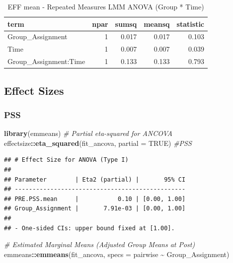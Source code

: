 \documentclass[
]{article}
\newenvironment{Shaded}{\begin{snugshade}}{\end{snugshade}}
\newcommand{\AttributeTok}[1]{\textcolor[rgb]{0.13,0.29,0.53}{#1}}
\newcommand{\CommentTok}[1]{\textcolor[rgb]{0.56,0.35,0.01}{\textit{#1}}}
\newcommand{\ConstantTok}[1]{\textcolor[rgb]{0.56,0.35,0.01}{#1}}
\newcommand{\FunctionTok}[1]{\textcolor[rgb]{0.13,0.29,0.53}{\textbf{#1}}}
\newcommand{\NormalTok}[1]{#1}
\newcommand{\SpecialCharTok}[1]{\textcolor[rgb]{0.81,0.36,0.00}{\textbf{#1}}}
\begin{document}
\begin{longtable}[t]{lrrrr}
\caption{\label{tab:unnamed-chunk-13}EFF mean - Repeated Measures LMM ANOVA (Group * Time)}\\
\toprule
term & npar & sumsq & meansq & statistic\\
\midrule
Group\_Assignment & 1 & 0.017 & 0.017 & 0.103\\
Time & 1 & 0.007 & 0.007 & 0.039\\
Group\_Assignment:Time & 1 & 0.133 & 0.133 & 0.793\\
\bottomrule
\end{longtable}

\subsection{Effect Sizes}\label{effect-sizes}

\subsubsection{PSS}\label{pss}

\begin{Shaded}
\begin{Highlighting}[]
\FunctionTok{library}\NormalTok{(emmeans)}
\CommentTok{\# Partial eta{-}squared for ANCOVA}
\NormalTok{effectsize}\SpecialCharTok{::}\FunctionTok{eta\_squared}\NormalTok{(fit\_ancova, }\AttributeTok{partial =} \ConstantTok{TRUE}\NormalTok{) }\CommentTok{\#PSS}
\end{Highlighting}
\end{Shaded}

\begin{verbatim}
## # Effect Size for ANOVA (Type I)
## 
## Parameter        | Eta2 (partial) |       95% CI
## ------------------------------------------------
## PRE.PSS.mean     |           0.10 | [0.00, 1.00]
## Group_Assignment |       7.91e-03 | [0.00, 1.00]
## 
## - One-sided CIs: upper bound fixed at [1.00].
\end{verbatim}

\begin{Shaded}
\begin{Highlighting}[]
\CommentTok{\# Estimated Marginal Means (Adjusted Group Means at Post)}
\NormalTok{emmeans}\SpecialCharTok{::}\FunctionTok{emmeans}\NormalTok{(fit\_ancova, }\AttributeTok{specs =}\NormalTok{ pairwise }\SpecialCharTok{\textasciitilde{}}\NormalTok{ Group\_Assignment)}
\end{Highlighting}
\end{Shaded}
\end{document}
